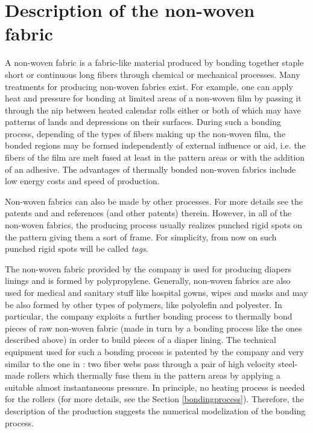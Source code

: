 \section{Description of the non-woven fabric}
\label{description_nonwoven_fabric}
A non-woven fabric is a fabric-like material produced by bonding together staple short or continuous long fibers through chemical or mechanical processes. Many treatments for producing non-woven fabrics exist. For example, one can apply heat and pressure for bonding at limited areas of a non-woven film by passing it through the nip between heated calendar rolls either or both of which may have patterns of lands and depressions on their surfaces. During such a bonding process, depending of the types of fibers making up the non-woven film, the bonded regions may be formed independently of external influence or aid, i.e. the fibers of the film are melt fused at least in the pattern areas or with the addition of an adhesive. The advantages of thermally bonded non-woven fabrics include low energy costs and speed of production. 
\par
Non-woven fabrics can also be made by other processes. For more details see the patents \cite{Patent1} and \cite {Patent2} and references (and other patents) therein. However, in all of the non-woven fabrics, the producing process usually realizes punched rigid spots on the pattern giving them a sort of frame. For simplicity, from now on such punched rigid spots will be called \textit{tags}.
\par
The non-woven fabric provided by the company is used for producing diapers linings and is formed by polypropylene. Generally, non-woven fabrics are also used for medical and sanitary stuff like hospital gowns, wipes and masks and may be also formed by other types of polymers, like polyolefin and polyester. In particular, the company exploits a further bonding process to thermally bond pieces of raw non-woven fabric (made in turn by a bonding process like the ones described above) in order to build pieces of a diaper lining. The technical equipment used for such a bonding process is patented by the company and very similar to the one in \cite{Patent2}: two fiber webs pass through a pair of high velocity steel-made rollers which thermally fuse them in the pattern areas by applying a suitable almost instantaneous pressure. In principle, no heating process is needed for the rollers (for more details, see the Section \ref{bondingprocess}). Therefore, the description of the production suggests the numerical modelization of the bonding process.

